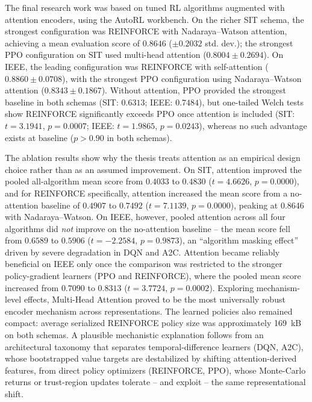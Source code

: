 \documentclass[12pt,oneside]{book}
\begin{document}
The final research work was based on tuned RL algorithms augmented with attention encoders, using the AutoRL workbench. On the richer SIT schema, the strongest configuration was \textsc{REINFORCE} with Nadaraya--Watson attention, achieving a mean evaluation score of $0.8646$ ($\pm0.2032$ std. dev.); the strongest \textsc{PPO} configuration on SIT used multi-head attention ($0.8004 \pm 0.2694$). On IEEE, the leading configuration was \textsc{REINFORCE} with self-attention ($0.8860 \pm 0.0708$), with the strongest \textsc{PPO} configuration using Nadaraya--Watson attention ($0.8343 \pm 0.1867$). Without attention, \textsc{PPO} provided the strongest baseline in both schemas (SIT: $0.6313$; IEEE: $0.7484$), but one-tailed Welch tests show \textsc{REINFORCE} significantly exceeds \textsc{PPO} once attention is included (SIT: $t=3.1941$, $p=0.0007$; IEEE: $t=1.9865$, $p=0.0243$), whereas no such advantage exists at baseline ($p>0.90$ in both schemas).

The ablation results show why the thesis treats attention as an empirical design choice rather than as an assumed improvement. On SIT, attention improved the pooled all-algorithm mean score from $0.4033$ to $0.4830$ ($t=4.6626$, $p=0.0000$), and for \textsc{REINFORCE} specifically, attention increased the mean score from a no-attention baseline of $0.4907$ to $0.7492$ ($t=7.1139$, $p=0.0000$), peaking at $0.8646$ with Nadaraya--Watson. On IEEE, however, pooled attention across all four algorithms did \emph{not} improve on the no-attention baseline -- the mean score fell from $0.6589$ to $0.5906$ ($t=-2.2584$, $p=0.9873$), an ``algorithm masking effect'' driven by severe degradation in \textsc{DQN} and \textsc{A2C}. Attention became reliably beneficial on IEEE only once the comparison was restricted to the stronger policy-gradient learners (\textsc{PPO} and \textsc{REINFORCE}), where the pooled mean score increased from $0.7090$ to $0.8313$ ($t=3.7724$, $p=0.0002$). Exploring mechanism-level effects, Multi-Head Attention proved to be the most universally robust encoder mechanism across representations. The learned policies also remained compact: average serialized \textsc{REINFORCE} policy size was approximately 169~kB on both schemas. A plausible mechanistic explanation follows from an architectural taxonomy that separates temporal-difference learners (\textsc{DQN}, \textsc{A2C}), whose bootstrapped value targets are destabilized by shifting attention-derived features, from direct policy optimizers (\textsc{REINFORCE}, \textsc{PPO}), whose Monte-Carlo returns or trust-region updates tolerate -- and exploit -- the same representational shift.
\end{document}
